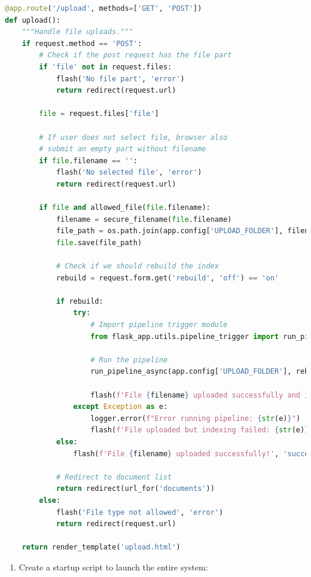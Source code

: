 \documentclass[
  screen,review,acmlarge]{acmart}
\providecommand{\tightlist}{%
  \setlength{\itemsep}{0pt}\setlength{\parskip}{0pt}}
\begin{document}
\begin{lstlisting}[language=Python]
@app.route('/upload', methods=['GET', 'POST'])
def upload():
    """Handle file uploads."""
    if request.method == 'POST':
        # Check if the post request has the file part
        if 'file' not in request.files:
            flash('No file part', 'error')
            return redirect(request.url)
        
        file = request.files['file']
        
        # If user does not select file, browser also
        # submit an empty part without filename
        if file.filename == '':
            flash('No selected file', 'error')
            return redirect(request.url)
        
        if file and allowed_file(file.filename):
            filename = secure_filename(file.filename)
            file_path = os.path.join(app.config['UPLOAD_FOLDER'], filename)
            file.save(file_path)
            
            # Check if we should rebuild the index
            rebuild = request.form.get('rebuild', 'off') == 'on'
            
            if rebuild:
                try:
                    # Import pipeline trigger module
                    from flask_app.utils.pipeline_trigger import run_pipeline_async
                    
                    # Run the pipeline
                    run_pipeline_async(app.config['UPLOAD_FOLDER'], rebuild=rebuild)
                    
                    flash(f'File {filename} uploaded successfully and indexing started!', 'success')
                except Exception as e:
                    logger.error(f"Error running pipeline: {str(e)}")
                    flash(f'File uploaded but indexing failed: {str(e)}', 'warning')
            else:
                flash(f'File {filename} uploaded successfully!', 'success')
            
            # Redirect to document list
            return redirect(url_for('documents'))
        else:
            flash('File type not allowed', 'error')
            return redirect(request.url)
    
    return render_template('upload.html')
\end{lstlisting}

\begin{enumerate}
\def\labelenumi{\arabic{enumi}.}
\setcounter{enumi}{2}
\tightlist
\item
  Create a startup script to launch the entire system:
\end{enumerate}
\end{document}

